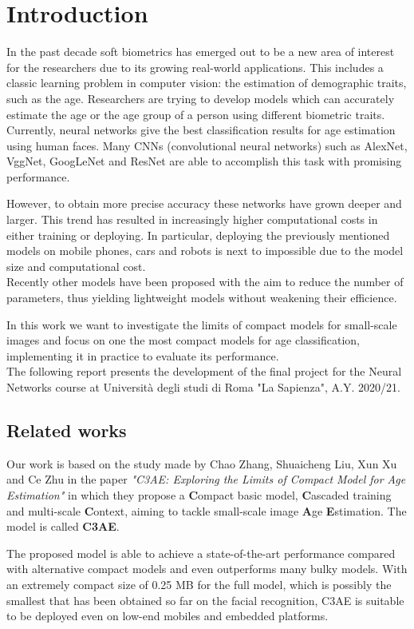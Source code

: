 
\chapter{Introduction}
In the past decade soft biometrics has emerged out to be a new area of interest for the researchers due to its growing real-world 
applications. This includes a classic learning problem in computer vision: the estimation of demographic traits, such as the age. 
Researchers are trying to develop models which can accurately estimate the age or the age group of a person using different 
biometric traits. Currently, neural networks give the best classification results for age estimation using human faces.
Many CNNs (convolutional neural networks) such as AlexNet, VggNet, GoogLeNet and ResNet are able to accomplish this task with promising 
performance.\

However, to obtain more precise accuracy these networks have grown deeper and larger. This trend has resulted in increasingly higher 
computational costs in either training or deploying. In particular, deploying the previously mentioned models on mobile phones, cars and 
robots is next to impossible due to the model size and computational cost.\\
Recently other models have been proposed with the aim to reduce the number of parameters, thus yielding lightweight models without 
weakening their efficience.

In this work we want to investigate the limits of compact models for small-scale images and focus on one the most compact models for age 
classification, implementing it in practice to evaluate its performance.\\
The following report presents the development of the final project for the Neural Networks course at Università degli studi di Roma 
"La Sapienza", A.Y. 2020/21.

\section{Related works}

Our work is based on the study made by Chao Zhang, Shuaicheng Liu, Xun Xu and Ce Zhu in the paper \textit{"C3AE: Exploring the Limits 
of Compact Model for Age Estimation"} \cite{c3ae} in which they propose a \textbf{C}ompact basic model, \textbf{C}ascaded training 
and multi-scale \textbf{C}ontext, aiming to tackle small-scale image \textbf{A}ge \textbf{E}stimation. The model is called \textbf{C3AE}.

The proposed model is able to achieve a state-of-the-art performance compared with alternative compact models and even outperforms many 
bulky models. With an extremely compact size of 0.25 MB for the full model, which is possibly the smallest that has been
obtained so far on the facial recognition, C3AE is suitable to be deployed even on low-end mobiles and embedded platforms.
